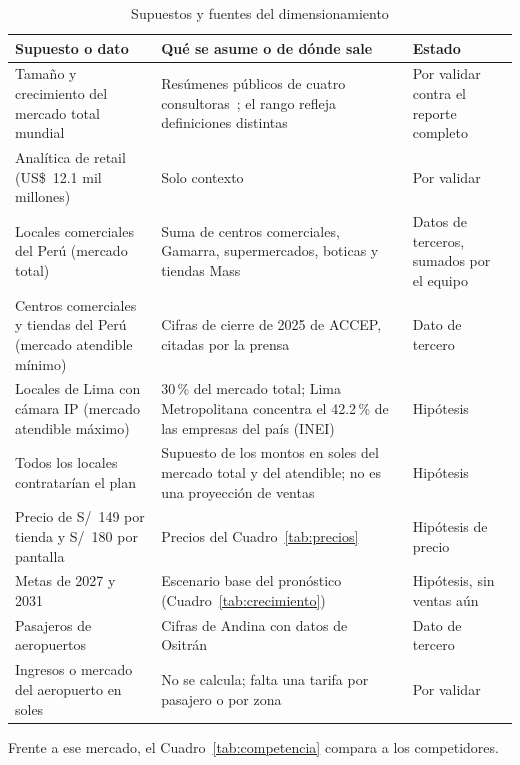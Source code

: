 \documentclass[12pt,a4paper]{article}
\begin{document}
\begin{table}[H]
\caption{Supuestos y fuentes del dimensionamiento}
\label{tab:supuestos-mercado}
\centering
\footnotesize
\renewcommand{\arraystretch}{1.12}
\begin{tabular}{|L{0.30\textwidth}|L{0.38\textwidth}|L{0.20\textwidth}|}
\hline
\textbf{Supuesto o dato} & \textbf{Qué se asume o de dónde sale} & \textbf{Estado} \\
\hline
Tamaño y crecimiento del mercado total mundial & Resúmenes públicos de cuatro consultoras~\cite{grandview,mordor,intelmr,gmi}; el rango refleja definiciones distintas & Por validar contra el reporte completo \\
\hline
Analítica de retail (US\$~12.1 mil millones) & Solo contexto~\cite{imarc} & Por validar \\
\hline
Locales comerciales del Perú (mercado total) & Suma de centros comerciales, Gamarra, supermercados, boticas y tiendas Mass~\cite{accepclicc,peruretail,forbes,gestion,massretail} & Datos de terceros, sumados por el equipo \\
\hline
Centros comerciales y tiendas del Perú (mercado atendible mínimo) & Cifras de cierre de 2025 de ACCEP, citadas por la prensa~\cite{accepclicc} & Dato de tercero \\
\hline
Locales de Lima con cámara IP (mercado atendible máximo) & 30\,\% del mercado total; Lima Metropolitana concentra el 42.2\,\% de las empresas del país (INEI)~\cite{inei} & Hipótesis \\
\hline
Todos los locales contratarían el plan & Supuesto de los montos en soles del mercado total y del atendible; no es una proyección de ventas & Hipótesis \\
\hline
Precio de S/~149 por tienda y S/~180 por pantalla & Precios del Cuadro~\ref{tab:precios} & Hipótesis de precio \\
\hline
Metas de 2027 y 2031 & Escenario base del pronóstico (Cuadro~\ref{tab:crecimiento}) & Hipótesis, sin ventas aún \\
\hline
Pasajeros de aeropuertos & Cifras de Andina con datos de Ositrán~\cite{andina2025,andina2026} & Dato de tercero \\
\hline
Ingresos o mercado del aeropuerto en soles & No se calcula; falta una tarifa por pasajero o por zona & Por validar \\
\hline
\end{tabular}
\end{table}

Frente a ese mercado, el Cuadro~\ref{tab:competencia} compara a los
competidores.
\end{document}
